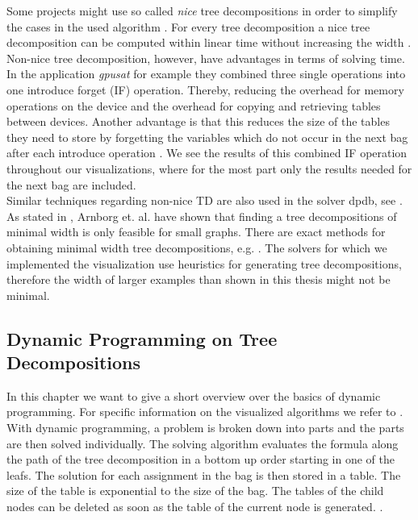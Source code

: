 \documentclass[a4paper, 12pt, bibliography=totoc]{scrartcl}
\begin{document}
\medskip\noindent
Some projects might use so called \textit{nice} tree decompositions in order to simplify the cases in the used algorithm \cite[Ch.~2.2]{DiplomarbeitZisser}.
For every tree decomposition a nice tree decomposition can be computed within linear time without increasing the width \cite{klokstw}.
Non-nice tree decomposition, however, have advantages in terms of solving time. In the application \textit{gpusat} for example they combined three single operations into one introduce forget (IF) operation. Thereby, reducing the overhead for memory operations on the device and the overhead for copying and retrieving tables between devices. Another advantage is that this reduces the size of the tables they need to store by forgetting the variables which do not occur in the next bag after each introduce operation \cite[Ch.~4.2.1]{DiplomarbeitZisser}. 
We see the results of this combined IF operation throughout our visualizations, where for the most part only the results needed for the next bag are included.\\
Similar techniques regarding non-nice TD are also used in the solver dpdb, see \cite[Ch.~4.1]{dpdbpadl2020}.\\

As stated in \cite[Ch.~2.2]{DiplomarbeitZisser}, Arnborg et. al. \cite{arnborgtd} have shown that finding a tree decompositions of minimal width is only feasible for small graphs.  There are exact methods for obtaining minimal width tree decompositions,  e.g. \cite{gogatetw, bachoore06}. The solvers for which we implemented the visualization use heuristics  for  generating tree decompositions, therefore  the width of larger examples than shown in this thesis might not be minimal. 


\subsection{Dynamic Programming on Tree Decompositions}
In this chapter we want to give a short overview over the basics of dynamic programming. For specific information on the visualized algorithms we refer to \cite{DiplomarbeitZisser, samermodelcounting, dpdbpadl2020}. \\

With dynamic programming, a problem is broken down into parts and the parts are then solved individually. The solving algorithm evaluates the formula along the path of the tree decomposition in a bottom up order starting in one of the leafs. The solution for each assignment in the bag is then stored in a table. The size of the table is exponential to the size of the bag. The tables of the child nodes can be deleted as soon as the table of the current node is generated. \cite[Ch. 3.1]{DiplomarbeitZisser}.\\
\end{document}
